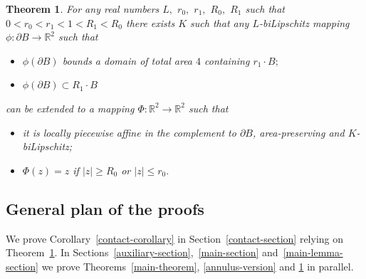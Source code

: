 \documentclass[12pt]{article}
\newtheorem{theo}[prop]{Theorem}
\theoremstyle{definition}
\begin{document}
\begin{theo}
\label{the-technical-lemma-without-parameters}
For any real numbers $L,$ $r_0,$ $r_1,$ $R_0,$ $R_1$ such that $0 < r_0 < r_1 < 1 <R_1<R_0$  there exists $K$ such that any $L$-biLipschitz mapping $\phi:\partial B\to\mathbb R^2$ such that 
\begin{itemize}
\item $\phi(\partial B)$ bounds a domain of total area $4$ containing $r_1\cdot B;$
\item $\phi(\partial B)\subset R_1\cdot B$
\end{itemize}
can be extended to a mapping $\Phi:\mathbb R^2\to\mathbb R^2$ such that
\begin{itemize} 
\item it is locally piecewise affine in the complement to $\partial B$, area-preserving and $K$-biLipschitz;
\item $\Phi(z) = z$ if $|z|\ge R_0$ or $|z|\le r_0.$ 
\end{itemize}
\end{theo}

\subsection{General plan of the proofs}

We prove Corollary~\ref{contact-corollary} in Section~\ref{contact-section} relying on Theorem~\ref{the-technical-lemma-without-parameters}. In Sections~\ref{auxiliary-section},~\ref{main-section} and~\ref{main-lemma-section} we prove Theorems~\ref{main-theorem}, \ref{annulus-version} and \ref{the-technical-lemma-without-parameters} in parallel. 
\end{document}
